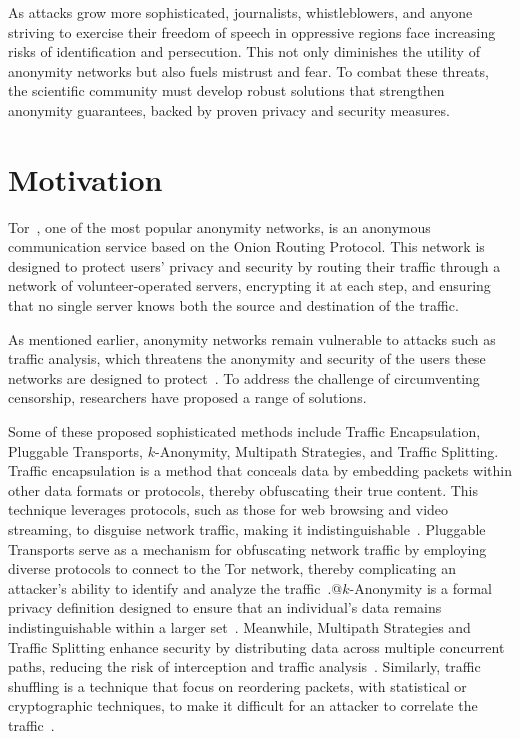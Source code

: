 As attacks grow more sophisticated, journalists, whistleblowers, and anyone striving to exercise their freedom of speech in oppressive regions face increasing risks of identification and persecution. This not only diminishes the utility of anonymity networks but also fuels mistrust and fear. To combat these threats, the scientific community must develop robust solutions that strengthen anonymity guarantees, backed by proven privacy and security measures.


\section{Motivation}\label{sec:motivation}

Tor~\cite{dingledine2004tor}, one of the most popular anonymity networks, is an anonymous communication service based on the Onion Routing Protocol. This network is designed to protect users' privacy and security by routing their traffic through a network of volunteer-operated servers, encrypting it at each step, and ensuring that no single server knows both the source and destination of the traffic.

As mentioned earlier, anonymity networks remain vulnerable to attacks such as traffic analysis, which threatens the anonymity and security of the users these networks are designed to protect~\cite*{chakravarty2014trafficanalysis, winter2012great, robjansen2019dosontor, StatDisclosure, PracticalStatDisclosure, DeepFingerprinting, TikTok, OnlineWebFingerprinting, TrafficAnalysisLowMixnet, AnalysisMixNetsYeZhu}. To address the challenge of circumventing censorship, researchers have proposed a range of solutions. 

Some of these proposed sophisticated methods include Traffic Encapsulation, Pluggable Transports, \(k\)-Anonymity, Multipath Strategies, and Traffic Splitting. Traffic encapsulation is a method that conceals data by embedding packets within other data formats or protocols, thereby obfuscating their true content. This technique leverages protocols, such as those for web browsing and video streaming, to disguise network traffic, making it indistinguishable~\cite*{TorKameleon, MIRACE, StegoTorus, Protozoa, Stegozoa, Freewave}. Pluggable Transports serve as a mechanism for obfuscating network traffic by employing diverse protocols to connect to the Tor network, thereby complicating an attacker's ability to identify and analyze the traffic~\cite*{PlugTrans,Circumvention,TorKameleon}.@\(k\)-Anonymity is a formal privacy definition designed to ensure that an individual's data remains indistinguishable within a larger set~\cite*{DP_Book,KAnonSweeney,kAnonymityEffectiveness}. Meanwhile, Multipath Strategies and Traffic Splitting enhance security by distributing data across multiple concurrent paths, reducing the risk of interception and traffic analysis~\cite*{TorKameleon,MIRACE,Loopix,Wang_2022}. Similarly, traffic shuffling is a technique that focus on reordering packets, with statistical or cryptographic techniques, to make it difficult for an attacker to correlate the traffic~\cite*{DAENet, Karaoke, Riposte, Loopix, Dissent}. 

